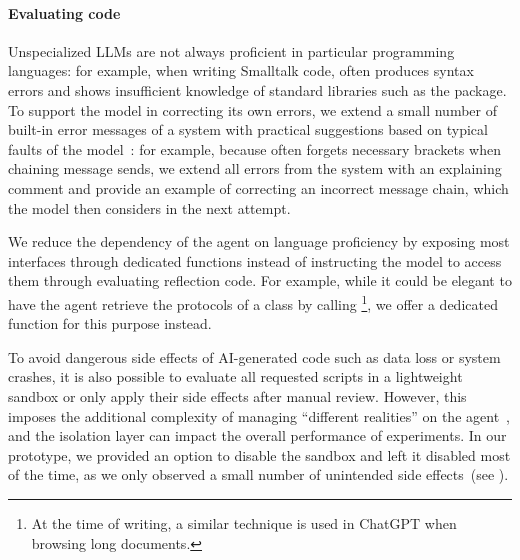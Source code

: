 \paragraph{Evaluating code}
Unspecialized LLMs are not always proficient in particular programming languages:
for example, when writing Smalltalk code, \gptfouro often produces syntax errors and shows insufficient knowledge of standard libraries such as the  package.
To support the model in correcting its own errors, we extend a small number of built-in error messages of a system with practical suggestions based on typical faults of the model~\cite{traver2010compiler}:
for example, because \gptfouro often forgets necessary brackets when chaining message sends, we extend all  errors from the system with an explaining comment and provide an example of correcting an incorrect message chain, which the model then considers in the next attempt.

We reduce the dependency of the agent on language proficiency by exposing most interfaces through dedicated functions instead of instructing the model to access them through evaluating reflection code.
For example, while it could be elegant to have the agent retrieve the protocols of a class by calling \footnote{
	At the time of writing, a similar technique is used in ChatGPT when browsing long documents.
}, we offer a dedicated  function for this purpose instead.

To avoid dangerous side effects of AI-generated code such as data loss or system crashes, it is also possible to evaluate all requested scripts in a lightweight sandbox or only apply their side effects after manual review.
However, this imposes the additional complexity of managing ``different realities'' on the agent~\cite{rehwaldt2012exploring}, and the isolation layer can impact the overall performance of experiments.
In our prototype, we provided an option to disable the sandbox and left it disabled most of the time, as we only observed a small number of unintended side effects~(see ).
